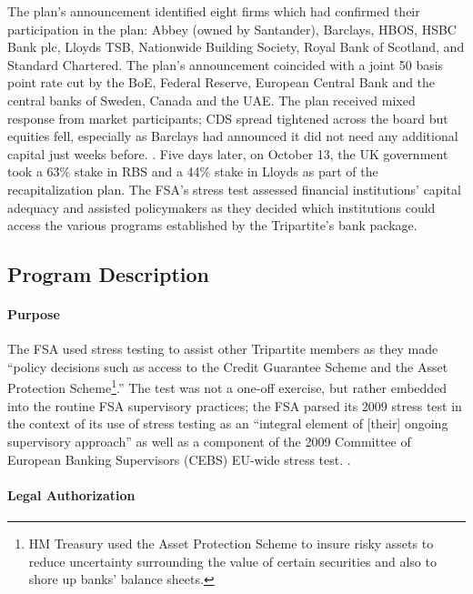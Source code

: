 \documentclass[12pt]{article}
\begin{document}
The plan's announcement identified eight firms which had confirmed their participation in the plan: Abbey (owned by Santander), Barclays, HBOS, HSBC Bank plc, Lloyds TSB, Nationwide Building Society, Royal Bank of Scotland, and Standard Chartered. The plan's announcement coincided with a joint 50 basis point rate cut by the BoE, Federal Reserve, European Central Bank and the central banks of Sweden, Canada and the UAE. The plan received mixed response from market participants; CDS spread tightened across the board but equities fell, especially as Barclays had announced it did not need any additional capital just weeks before. \citep{BRSAnnouncement}. Five days later, on October 13, the UK government took a 63\% stake in RBS and a 44\% stake in Lloyds as part of the recapitalization plan. The FSA's stress test assessed financial institutions' capital adequacy and assisted policymakers as they decided which institutions could access the various programs established by the Tripartite's bank package.

\subsection{Program Description}

\paragraph{Purpose}

The FSA used stress testing to assist other Tripartite members as they made ``policy decisions such as access to the Credit Guarantee Scheme and the Asset Protection Scheme\footnote{HM Treasury used the Asset Protection Scheme to insure risky assets to reduce uncertainty surrounding the value of certain securities and also to shore up banks' balance sheets.}.'' The test was not a one-off exercise, but rather embedded into the routine FSA supervisory practices; the FSA parsed its 2009 stress test in the context of its use of stress testing as an ``integral element of [their] ongoing supervisory approach'' as well as a component of the 2009 Committee of European Banking Supervisors (CEBS) EU-wide stress test. \citep{Results}.

\paragraph{Legal Authorization}
\end{document}
